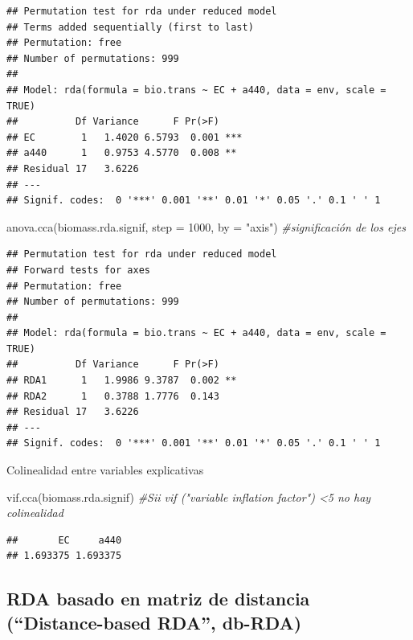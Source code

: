 \documentclass[
]{book}
\newenvironment{Shaded}{\begin{snugshade}}{\end{snugshade}}
\newcommand{\AttributeTok}[1]{\textcolor[rgb]{0.77,0.63,0.00}{#1}}
\newcommand{\CommentTok}[1]{\textcolor[rgb]{0.56,0.35,0.01}{\textit{#1}}}
\newcommand{\DecValTok}[1]{\textcolor[rgb]{0.00,0.00,0.81}{#1}}
\newcommand{\FunctionTok}[1]{\textcolor[rgb]{0.00,0.00,0.00}{#1}}
\newcommand{\NormalTok}[1]{#1}
\newcommand{\StringTok}[1]{\textcolor[rgb]{0.31,0.60,0.02}{#1}}
\begin{document}
\begin{verbatim}
## Permutation test for rda under reduced model
## Terms added sequentially (first to last)
## Permutation: free
## Number of permutations: 999
## 
## Model: rda(formula = bio.trans ~ EC + a440, data = env, scale = TRUE)
##          Df Variance      F Pr(>F)    
## EC        1   1.4020 6.5793  0.001 ***
## a440      1   0.9753 4.5770  0.008 ** 
## Residual 17   3.6226                  
## ---
## Signif. codes:  0 '***' 0.001 '**' 0.01 '*' 0.05 '.' 0.1 ' ' 1
\end{verbatim}

\begin{Shaded}
\begin{Highlighting}[]
\FunctionTok{anova.cca}\NormalTok{(biomass.rda.signif, }\AttributeTok{step =} \DecValTok{1000}\NormalTok{, }\AttributeTok{by =} \StringTok{"axis"}\NormalTok{) }\CommentTok{\#significación de los ejes}
\end{Highlighting}
\end{Shaded}

\begin{verbatim}
## Permutation test for rda under reduced model
## Forward tests for axes
## Permutation: free
## Number of permutations: 999
## 
## Model: rda(formula = bio.trans ~ EC + a440, data = env, scale = TRUE)
##          Df Variance      F Pr(>F)   
## RDA1      1   1.9986 9.3787  0.002 **
## RDA2      1   0.3788 1.7776  0.143   
## Residual 17   3.6226                 
## ---
## Signif. codes:  0 '***' 0.001 '**' 0.01 '*' 0.05 '.' 0.1 ' ' 1
\end{verbatim}

Colinealidad entre variables explicativas

\begin{Shaded}
\begin{Highlighting}[]
\FunctionTok{vif.cca}\NormalTok{(biomass.rda.signif) }\CommentTok{\#Sii vif ("variable inflation factor") \textless{}5 no hay colinealidad}
\end{Highlighting}
\end{Shaded}

\begin{verbatim}
##       EC     a440 
## 1.693375 1.693375
\end{verbatim}

\hypertarget{rda-basado-en-matriz-de-distancia-distance-based-rda-db-rda}{%
\subsection{RDA basado en matriz de distancia (``Distance-based RDA'', db-RDA)}\label{rda-basado-en-matriz-de-distancia-distance-based-rda-db-rda}}
\end{document}
